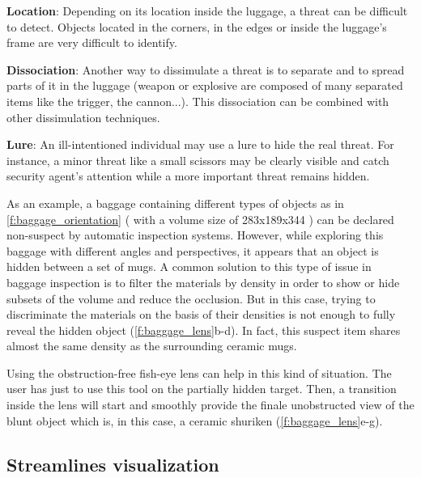 \textbf{Location}: Depending on its location inside the luggage, a threat can be difficult to detect. Objects located in the corners, in the edges or inside the luggage’s frame are very difficult to identify.

\textbf{Dissociation}: Another way to dissimulate a threat is to separate and to spread parts of it in the luggage (weapon or explosive are composed of many separated items like the trigger, the cannon...). This dissociation can be combined with other dissimulation techniques.

\textbf{Lure}: An ill-intentioned individual may use a lure to hide the real threat. For instance, a minor threat like a small scissors may be clearly visible and catch security agent’s attention while a more important threat remains hidden.

As an example, a baggage containing different types of objects as in \autoref{f:baggage_orientation} ( with a volume size of 283x189x344 ) can be declared non-suspect by automatic inspection systems. However, while exploring this baggage with different angles and perspectives, it appears that an object is hidden between a set of mugs. A common solution to this type of issue in baggage inspection is to filter the materials by density in order to show or hide subsets of the volume and reduce the occlusion. But in this case, trying to discriminate the materials on the basis of their densities is not enough to fully reveal the hidden object (\autoref{f:baggage_lens}b-d). In fact, this suspect item shares almost the same density as the surrounding ceramic mugs. 

Using the obstruction-free fish-eye lens can help in this kind of situation. The user has just to use this tool on the partially hidden target. Then, a transition inside the lens will start and smoothly provide the finale unobstructed view of the blunt object which is, in this case, a ceramic shuriken (\autoref{f:baggage_lens}e-g). 



\subsection{Streamlines visualization}



